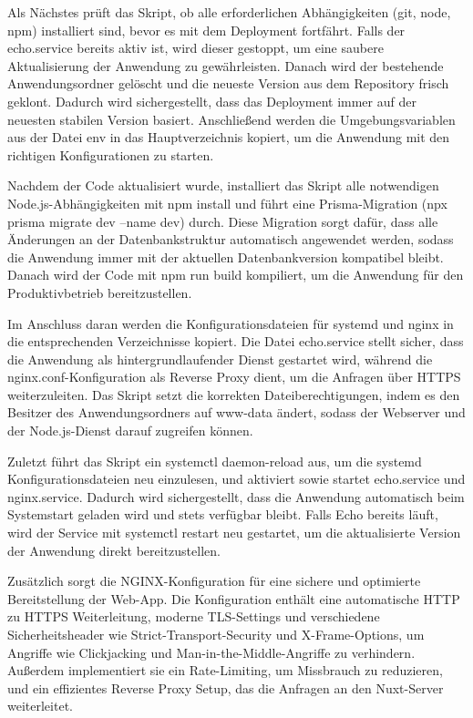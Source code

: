 \documentclass[a4paper,12pt]{article}
\begin{document}
Als Nächstes prüft das Skript, ob alle erforderlichen Abhängigkeiten (git,
node, npm) installiert sind, bevor es mit dem Deployment fortfährt. Falls der
echo.service bereits aktiv ist, wird dieser gestoppt, um eine saubere
Aktualisierung der Anwendung zu gewährleisten. Danach wird der bestehende
Anwendungsordner gelöscht und die neueste Version aus dem Repository frisch
geklont. Dadurch wird sichergestellt, dass das Deployment immer auf der
neuesten stabilen Version basiert. Anschließend werden die Umgebungsvariablen
aus der Datei env in das Hauptverzeichnis kopiert, um die Anwendung mit den
richtigen Konfigurationen zu starten.

Nachdem der Code aktualisiert wurde, installiert das Skript alle notwendigen
Node.js-Abhängigkeiten mit npm install und führt eine Prisma-Migration (npx
prisma migrate dev --name dev) durch. Diese Migration sorgt dafür, dass alle
Änderungen an der Datenbankstruktur automatisch angewendet werden, sodass die
Anwendung immer mit der aktuellen Datenbankversion kompatibel bleibt. Danach
wird der Code mit npm run build kompiliert, um die Anwendung für den
Produktivbetrieb bereitzustellen.

Im Anschluss daran werden die Konfigurationsdateien für systemd und nginx in
die entsprechenden Verzeichnisse kopiert. Die Datei echo.service stellt sicher,
dass die Anwendung als hintergrundlaufender Dienst gestartet wird, während die
nginx.conf-Konfiguration als Reverse Proxy dient, um die Anfragen über HTTPS
weiterzuleiten. Das Skript setzt die korrekten Dateiberechtigungen, indem es
den Besitzer des Anwendungsordners auf www-data ändert, sodass der Webserver
und der Node.js-Dienst darauf zugreifen können.

Zuletzt führt das Skript ein systemctl daemon-reload aus, um die
systemd Konfigurationsdateien neu einzulesen, und aktiviert sowie startet
echo.service und nginx.service. Dadurch wird sichergestellt, dass die Anwendung
automatisch beim Systemstart geladen wird und stets verfügbar bleibt. Falls
Echo bereits läuft, wird der Service mit systemctl restart neu gestartet, um
die aktualisierte Version der Anwendung direkt bereitzustellen.

Zusätzlich sorgt die NGINX-Konfiguration für eine sichere und optimierte
Bereitstellung der Web-App. Die Konfiguration enthält eine automatische
HTTP zu HTTPS Weiterleitung, moderne TLS-Settings und verschiedene
Sicherheitsheader wie Strict-Transport-Security und X-Frame-Options, um
Angriffe wie Clickjacking und Man-in-the-Middle-Angriffe zu verhindern.
Außerdem implementiert sie ein Rate-Limiting, um Missbrauch zu reduzieren, und
ein effizientes Reverse Proxy Setup, das die Anfragen an den Nuxt-Server
weiterleitet.
\end{document}
